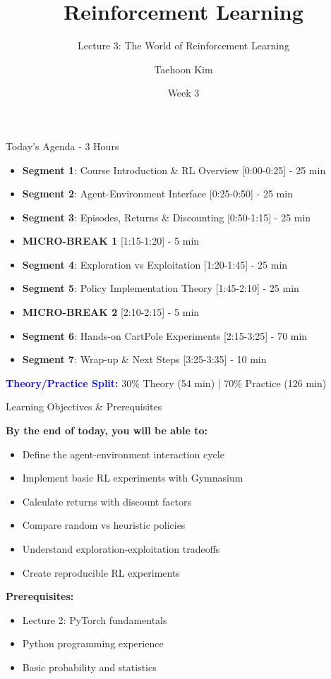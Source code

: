 \documentclass[aspectratio=169,10pt]{beamer}
\title{Reinforcement Learning}
\subtitle{Lecture 3: The World of Reinforcement Learning}
\author{Taehoon Kim}
\institute{Sogang University MIMIC Lab \\ \url{https://mimic-lab.com}}
\date{Week 3}
\begin{document}
\begin{frame}[plain]
    \titlepage
\end{frame}

\begin{frame}{Today's Agenda - 3 Hours}
\begin{itemize}
    \item \textbf{Segment 1}: Course Introduction \& RL Overview [0:00-0:25] - 25 min
    \item \textbf{Segment 2}: Agent-Environment Interface [0:25-0:50] - 25 min
    \item \textbf{Segment 3}: Episodes, Returns \& Discounting [0:50-1:15] - 25 min
    \item \textbf{MICRO-BREAK 1} [1:15-1:20] - 5 min
    \item \textbf{Segment 4}: Exploration vs Exploitation [1:20-1:45] - 25 min
    \item \textbf{Segment 5}: Policy Implementation Theory [1:45-2:10] - 25 min
    \item \textbf{MICRO-BREAK 2} [2:10-2:15] - 5 min
    \item \textbf{Segment 6}: Hands-on CartPole Experiments [2:15-3:25] - 70 min
    \item \textbf{Segment 7}: Wrap-up \& Next Steps [3:25-3:35] - 10 min
\end{itemize}

\vfill
\textcolor{blue}{\textbf{Theory/Practice Split:}} 30\% Theory (54 min) | 70\% Practice (126 min)
\end{frame}

\begin{frame}{Learning Objectives \& Prerequisites}

\textbf{By the end of today, you will be able to:}
\begin{itemize}
    \item Define the agent-environment interaction cycle
    \item Implement basic RL experiments with Gymnasium
    \item Calculate returns with discount factors
    \item Compare random vs heuristic policies
    \item Understand exploration-exploitation tradeoffs
    \item Create reproducible RL experiments
\end{itemize}

\vfill

\textbf{Prerequisites:}
\begin{itemize}
    \item Lecture 2: PyTorch fundamentals
    \item Python programming experience
    \item Basic probability and statistics
\end{itemize}

\end{frame}
\end{document}
